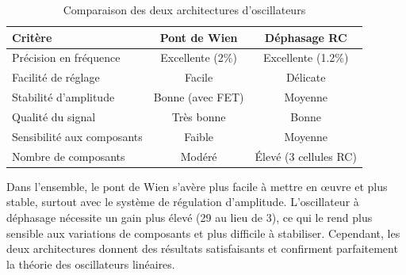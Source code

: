 \documentclass[11pt,a4paper]{report}
\begin{document}
\begin{table}[H]
\centering
\begin{tabular}{lcc}
\toprule
\textbf{Critère} & \textbf{Pont de Wien} & \textbf{Déphasage RC} \\
\midrule
Précision en fréquence & Excellente (2\%) & Excellente (1.2\%) \\
Facilité de réglage & Facile & Délicate \\
Stabilité d'amplitude & Bonne (avec FET) & Moyenne \\
Qualité du signal & Très bonne & Bonne \\
Sensibilité aux composants & Faible & Moyenne \\
Nombre de composants & Modéré & Élevé (3 cellules RC) \\
\bottomrule
\end{tabular}
\caption{Comparaison des deux architectures d'oscillateurs}
\end{table}

Dans l'ensemble, le pont de Wien s'avère plus facile à mettre en œuvre et plus stable, surtout avec le système de régulation d'amplitude. L'oscillateur à déphasage nécessite un gain plus élevé (29 au lieu de 3), ce qui le rend plus sensible aux variations de composants et plus difficile à stabiliser. Cependant, les deux architectures donnent des résultats satisfaisants et confirment parfaitement la théorie des oscillateurs linéaires.
\clearpage
\end{document}
